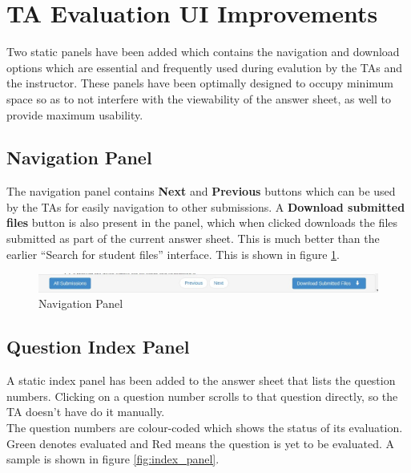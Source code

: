 \section{TA Evaluation UI Improvements}

Two static panels have been added which contains the navigation and download options which are essential and frequently used during evalution by the TAs and the instructor. These panels have been optimally designed to occupy minimum space so as to not interfere with the viewability of the answer sheet, as well to provide maximum usability.

\subsection{Navigation Panel}
The navigation panel contains \textbf{Next} and \textbf{Previous} buttons which can be used by the TAs for easily navigation to other submissions. A \textbf{Download submitted files} button is also present in the panel, which when clicked downloads the files submitted as part of the current answer sheet. This is much better than the earlier ``Search for student files'' interface. This is shown in figure \ref{fig:nav_panel}.

\begin{figure}[H]
\includegraphics[width=\textwidth]{images/nav_panel}
\caption{Navigation Panel}
\label{fig:nav_panel}
\end{figure}

\subsection{Question Index Panel}
A static index panel has been added to the answer sheet that lists the question numbers. Clicking on a question number scrolls to that question directly, so the TA doesn't have do it manually.\\
The question numbers are colour-coded which shows the status of its evaluation. Green denotes evaluated and Red means the question is yet to be evaluated. A sample is shown in figure \ref{fig:index_panel}.

